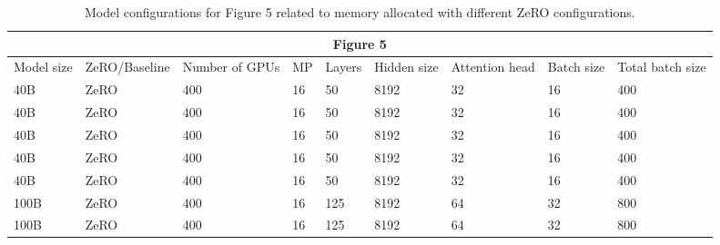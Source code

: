 \documentclass{article}
\begin{document}
\begin{table}[t!]
\scriptsize
\begin{tabular}{|l|l|l|l|l|l|l|l|l|}
\hline
\multicolumn{9}{|c|}{Figure 5} \\ \hline
Model size & ZeRO/Baseline & Number of GPUs & MP & Layers & Hidden size & Attention head & Batch size & Total batch size \\ \hline
40B & ZeRO & 400 & 16 & 50 & 8192 & 32 & 16 & 400 \\ \hline
40B & ZeRO & 400 & 16 & 50 & 8192 & 32 & 16 & 400 \\ \hline
40B & ZeRO & 400 & 16 & 50 & 8192 & 32 & 16 & 400 \\ \hline
40B & ZeRO & 400 & 16 & 50 & 8192 & 32 & 16 & 400 \\ \hline
40B & ZeRO & 400 & 16 & 50 & 8192 & 32 & 16 & 400 \\ \hline
100B & ZeRO & 400 & 16 & 125 & 8192 & 64 & 32 & 800 \\ \hline
100B & ZeRO & 400 & 16 & 125 & 8192 & 64 & 32 & 800 \\ \hline
\end{tabular}
\caption{Model configurations for Figure 5 related to memory allocated with different ZeRO configurations.}
\end{table}
\end{document}
